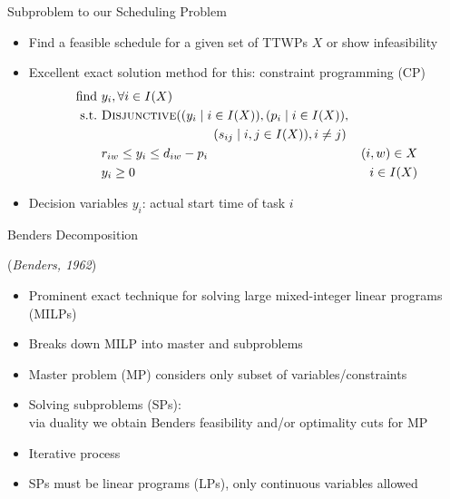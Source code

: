 \documentclass[aspectratio=1610]{beamer}
\newcommand{\important}[1]{{\color{green!60!black}#1}}
\begin{document}


\begin{frame}{Subproblem to our Scheduling Problem}

\begin{itemize}
	\itemsep2ex
	\item \important{Find a feasible schedule for a given set of TTWPs $X$ or show infeasibility}
	\item<2> Excellent exact solution method for this: \important{constraint programming (CP)}
	\begin{align}
		\text{find}~ & y_i,\forall i\in I(X)   \\
		\mathrm{s.t.} ~ & \textsc{Disjunctive}((y_{i}\mid i\in I(X)), (p_{i} \mid i \in I(X)), \nonumber\\
		  & \hspace*{3.1cm}(s_{ij}\mid i, j \in I(X)), i\not= j) \label{eq:sub_discjunctive}\\
							~ & r_{iw} \leq y_{i} \leq d_{iw} - p_{i} & (i, w) \in X \label{eq:sub_time_window_constraints}\\
		& y_i\ge 0 & i\in I(X)
	\end{align}
	\item<2> Decision variables $y_i$: actual start time of task $i$
	
\end{itemize}
\end{frame}




\begin{frame}{Benders Decomposition}

(\emph{Benders, 1962})

\bigskip
\begin{itemize}
	\itemsep1.5ex
	\item Prominent exact technique for solving large \important{mixed-integer linear programs (MILPs)}
	\item Breaks down MILP into \important{master} and \important{subproblems}
	\item Master problem (MP) considers only subset of variables/constraints
	\item Solving subproblems (SPs):\\
	via duality we obtain \important{Benders feasibility and/or optimality cuts} for MP
	\item Iterative process
	\item<2> \alert{SPs must be linear programs (LPs), only continuous variables allowed}
\end{itemize}
\end{frame}
\end{document}
